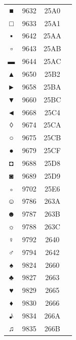 ﻿\documentclass[10pt]{article}
\begin{document}
\begin{tabular}{crcl}
■&9632&25A0&\\
□&9633&25A1&\\
▪&9642&25AA&\\
▫&9643&25AB&\\
▬&9644&25AC&\\
▲&9650&25B2&\\
►&9658&25BA&\\
▼&9660&25BC&\\
◄&9668&25C4&\\
◊&9674&25CA&\\
○&9675&25CB&\\
●&9679&25CF&\\
◘&9688&25D8&\\
◙&9689&25D9&\\
◦&9702&25E6&\\
☺&9786&263A&\\
☻&9787&263B&\\
☼&9788&263C&\\
♀&9792&2640&\\
♂&9794&2642&\\
♠&9824&2660&\\
♣&9827&2663&\\
♥&9829&2665&\\
♦&9830&2666&\\
♪&9834&266A&\\
♫&9835&266B&\\
\end{tabular}
\end{document}
